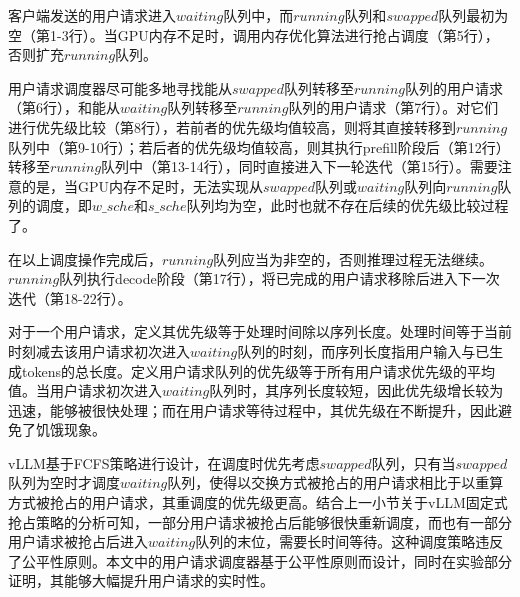 客户端发送的用户请求进入$waiting$队列中，而$running$队列和$swapped$队列最初为空（第1-3行）。当GPU内存不足时，调用内存优化算法进行抢占调度（第5行），否则扩充$running$队列。 \par
用户请求调度器尽可能多地寻找能从$swapped$队列转移至$running$队列的用户请求（第6行），和能从$waiting$队列转移至$running$队列的用户请求（第7行）。对它们进行优先级比较（第8行），若前者的优先级均值较高，则将其直接转移到$running$队列中（第9-10行）；若后者的优先级均值较高，则其执行prefill阶段后（第12行）转移至$running$队列中（第13-14行），同时直接进入下一轮迭代（第15行）。需要注意的是，当GPU内存不足时，无法实现从$swapped$队列或$waiting$队列向$running$队列的调度，即$w\_sche$和$s\_sche$队列均为空，此时也就不存在后续的优先级比较过程了。 \par
在以上调度操作完成后，$running$队列应当为非空的，否则推理过程无法继续。$running$队列执行decode阶段（第17行），将已完成的用户请求移除后进入下一次迭代（第18-22行）。 \par
对于一个用户请求，定义其优先级等于处理时间除以序列长度。处理时间等于当前时刻减去该用户请求初次进入$waiting$队列的时刻，而序列长度指用户输入与已生成tokens的总长度。定义用户请求队列的优先级等于所有用户请求优先级的平均值。当用户请求初次进入$waiting$队列时，其序列长度较短，因此优先级增长较为迅速，能够被很快处理；而在用户请求等待过程中，其优先级在不断提升，因此避免了饥饿现象。 \par
vLLM基于FCFS策略进行设计，在调度时优先考虑$swapped$队列，只有当$swapped$队列为空时才调度$waiting$队列，使得以交换方式被抢占的用户请求相比于以重算方式被抢占的用户请求，其重调度的优先级更高。结合上一小节关于vLLM固定式抢占策略的分析可知，一部分用户请求被抢占后能够很快重新调度，而也有一部分用户请求被抢占后进入$waiting$队列的末位，需要长时间等待。这种调度策略违反了公平性原则。本文中的用户请求调度器基于公平性原则而设计，同时在实验部分证明，其能够大幅提升用户请求的实时性。